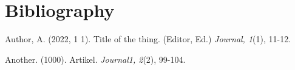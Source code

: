 \documentclass{article}
\begin{document}
  \parencite{Author2022}



 



\parencite{Another1000}



\section{Bibliography}

Author, A. (2022, 1 1). Title of the thing. (Editor, Ed.) \emph{Journal, 1}(1), 11-12.

Another. (1000). Artikel. \emph{Journal1, 2}(2), 99-104.
\end{document}
